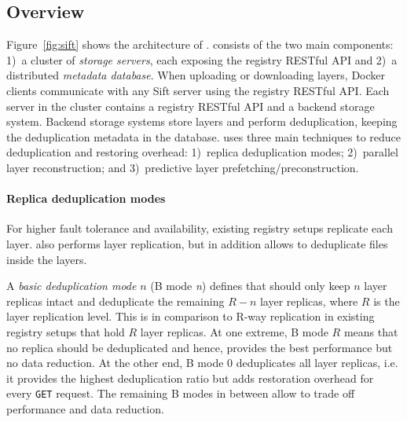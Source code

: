 \subsection{Overview}
\label{sec:overview}



Figure~\ref{fig:sift} shows the architecture of \sysname.
%
\sysname consists of the two main components: %
1)~a cluster of \emph{storage servers}, each
exposing the registry RESTful API and 2)~a distributed
\emph{metadata database}. 
%
When uploading or downloading layers, 
Docker clients communicate with any Sift
server using the registry RESTful API.
%
%
Each server in the cluster contains a registry RESTful API and a backend storage system.
%
Backend storage systems store
layers and perform deduplication, keeping the deduplication metadata in the
database.
%
%
%
\sysname uses three main techniques to reduce deduplication and restoring overhead:
1)~replica deduplication modes; 2)~parallel layer reconstruction; and
3)~predictive layer prefetching/preconstruction.




\paragraph{Replica deduplication modes}
%
For higher fault tolerance and availability, existing registry setups replicate each layer.
%
\sysname also performs layer replication, but in addition allows to deduplicate
files inside the layers.

A \emph{basic deduplication mode} $n$ (B mode \emph{n}) defines that \sysname should only
keep $n$ layer replicas intact and deduplicate the remaining $R-n$ layer
replicas, where $R$ is the layer replication level. This is in comparison to R-way replication in existing registry setups that hold $R$ layer replicas.
%
At one extreme, B mode $R$ means that no replica should be deduplicated and
hence, provides the best performance but no data reduction.
%
At the other end, B mode $0$ deduplicates all layer replicas, i.e. it provides
the highest deduplication ratio but adds restoration overhead for every
\texttt{GET} request.
%
The remaining B modes in between allow to trade off performance and data
reduction.


